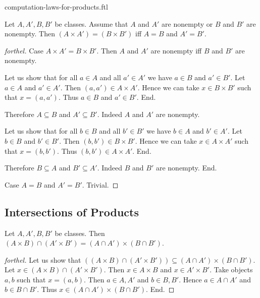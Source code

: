 \documentclass{naproche-library}
\begin{document}
\begin{smodule}{computation-laws-for-products.ftl}
  \begin{proposition}[forthel,id=FOUNDATIONS_05_2677218429894656,printid]
    Let $A, A', B, B'$ be classes.
    Assume that $A$ and $A'$ are nonempty or $B$ and $B'$ are nonempty.
    Then $(A \times A') = (B \times B')$ iff $A = B$ and $A' = B'$.
  \end{proposition}
  \begin{proof}[forthel]
    Case $A \times A' = B \times B'$.
      Then $A$ and $A'$ are nonempty iff $B$ and $B'$ are nonempty.

      Let us show that for all $a \in A$ and all $a' \in A'$ we have $a \in B$ and $a' \in B'$.
        Let $a \in A$ and $a' \in A'$.
        Then $(a, a') \in A \times A'$.
        Hence we can take $x \in B \times B'$ such that $x = (a, a')$.
        Thus $a \in B$ and $a' \in B'$.
      End.

      Therefore $A \subseteq B$ and $A' \subseteq B'$.
      Indeed $A$ and $A'$ are nonempty.

      Let us show that for all $b \in B$ and all $b' \in B'$ we have $b \in A$ and $b' \in A'$.
        Let $b \in B$ and $b' \in B'$.
        Then $(b, b') \in B \times B'$.
        Hence we can take $x \in A \times A'$ such that $x = (b, b')$.
        Thus $(b, b') \in A \times A'$.
      End.

      Therefore $B \subseteq A$ and $B' \subseteq A'$.
      Indeed $B$ and $B'$ are nonempty.
    End.

    Case $A = B$ and $A' = B'$. Trivial.
  \end{proof}


  \subsection*{Intersections of Products}

  \begin{proposition}[forthel,id=FOUNDATIONS_05_4154592050806784,printid]
    Let $A, A', B, B'$ be classes.
    Then $(A \times B) \cap (A' \times B') = (A \cap A') \times (B \cap B')$.
  \end{proposition}
  \begin{proof}[forthel]
    Let us show that $((A \times B) \cap (A' \times B')) \subseteq (A \cap A') \times (B \cap B')$. %
      Let $x \in (A \times B) \cap (A' \times B')$.
      Then $x \in A \times B$ and $x \in A' \times B'$.
      Take objects $a, b$ such that $x = (a, b)$.
      Then $a \in A, A'$ and $b \in B, B'$.
      Hence $a \in A \cap A'$ and $b \in B \cap B'$.
      Thus $x \in (A \cap A') \times (B \cap B')$.
    End.


\end{proof}
\end{smodule}
\end{document}
